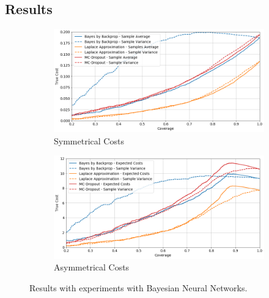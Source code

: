 \subsection{Results}

\begin{figure}[h]
	\centering
	\begin{subfigure}{\textwidth}
		\centering
		\includegraphics[width=\linewidth]{images/multi-class-bayesian-sym.png}
		\caption{Symmetrical Costs}	
	\end{subfigure}
	\begin{subfigure}{\textwidth}
		\centering
		\includegraphics[width=\linewidth]{images/multi-class-bayesian-asym.png}
		\caption{Asymmetrical Costs}
	\end{subfigure}
	\caption{Results with experiments with Bayesian Neural Networks.}
	\label{fig:multi-class-bayesian}
\end{figure}

